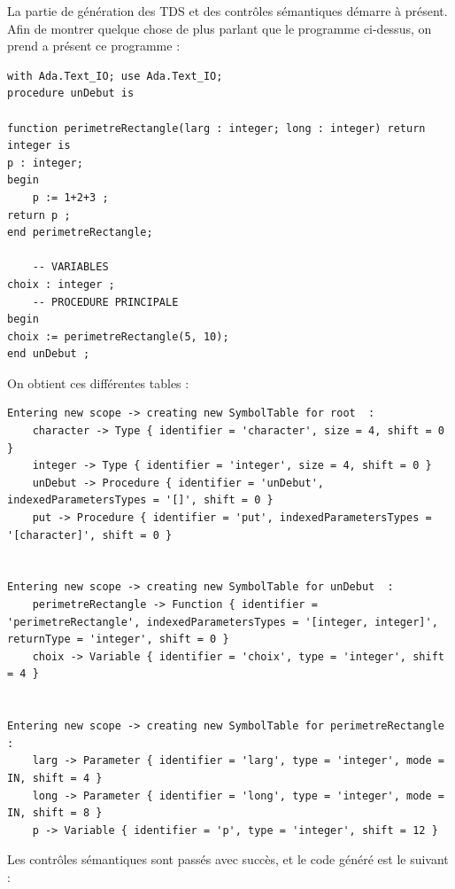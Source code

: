 \documentclass[french,a4paper]{article}
\begin{document}
    La partie de génération des TDS et des contrôles sémantiques démarre à présent. Afin de montrer quelque chose de plus parlant que le programme ci-dessus, on prend a présent ce programme : 

    \begin{lstlisting}[label={lst:lstlisting16}]
with Ada.Text_IO; use Ada.Text_IO;
procedure unDebut is

function perimetreRectangle(larg : integer; long : integer) return integer is
p : integer;
begin
    p := 1+2+3 ;
return p ;
end perimetreRectangle;

    -- VARIABLES
choix : integer ;
    -- PROCEDURE PRINCIPALE
begin
choix := perimetreRectangle(5, 10);
end unDebut ;
    \end{lstlisting}

    On obtient ces différentes tables :

    \begin{lstlisting}
Entering new scope -> creating new SymbolTable for root  : 
    character -> Type { identifier = 'character', size = 4, shift = 0 }
    integer -> Type { identifier = 'integer', size = 4, shift = 0 }
    unDebut -> Procedure { identifier = 'unDebut', indexedParametersTypes = '[]', shift = 0 }
    put -> Procedure { identifier = 'put', indexedParametersTypes = '[character]', shift = 0 }


Entering new scope -> creating new SymbolTable for unDebut  : 
    perimetreRectangle -> Function { identifier = 'perimetreRectangle', indexedParametersTypes = '[integer, integer]', returnType = 'integer', shift = 0 }
    choix -> Variable { identifier = 'choix', type = 'integer', shift = 4 }


Entering new scope -> creating new SymbolTable for perimetreRectangle  : 
    larg -> Parameter { identifier = 'larg', type = 'integer', mode = IN, shift = 4 }
    long -> Parameter { identifier = 'long', type = 'integer', mode = IN, shift = 8 }
    p -> Variable { identifier = 'p', type = 'integer', shift = 12 }
    \end{lstlisting}

    Les contrôles sémantiques sont passés avec succès, et le code généré est le suivant :
\end{document}
